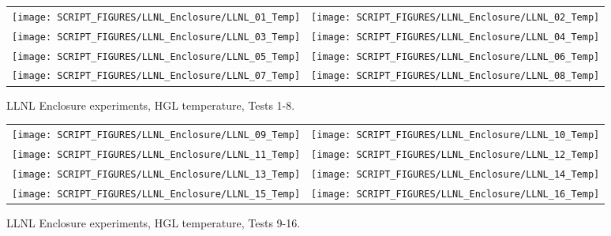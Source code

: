 \newpage

\begin{figure}[p]
\begin{tabular*}{\textwidth}{l@{\extracolsep{\fill}}r}
\texttt{[image: SCRIPT\_FIGURES/LLNL\_Enclosure/LLNL\_01\_Temp]} &
\texttt{[image: SCRIPT\_FIGURES/LLNL\_Enclosure/LLNL\_02\_Temp]} \\
\texttt{[image: SCRIPT\_FIGURES/LLNL\_Enclosure/LLNL\_03\_Temp]} &
\texttt{[image: SCRIPT\_FIGURES/LLNL\_Enclosure/LLNL\_04\_Temp]} \\
\texttt{[image: SCRIPT\_FIGURES/LLNL\_Enclosure/LLNL\_05\_Temp]} &
\texttt{[image: SCRIPT\_FIGURES/LLNL\_Enclosure/LLNL\_06\_Temp]} \\
\texttt{[image: SCRIPT\_FIGURES/LLNL\_Enclosure/LLNL\_07\_Temp]} &
\texttt{[image: SCRIPT\_FIGURES/LLNL\_Enclosure/LLNL\_08\_Temp]}
\end{tabular*}
\caption[LLNL Enclosure experiments, HGL temperature, Tests 1-8]
{LLNL Enclosure experiments, HGL temperature, Tests 1-8.}
\label{LLNL_Enclosure_Temp_1}
\end{figure}

\begin{figure}[p]
\begin{tabular*}{\textwidth}{l@{\extracolsep{\fill}}r}
\texttt{[image: SCRIPT\_FIGURES/LLNL\_Enclosure/LLNL\_09\_Temp]} &
\texttt{[image: SCRIPT\_FIGURES/LLNL\_Enclosure/LLNL\_10\_Temp]} \\
\texttt{[image: SCRIPT\_FIGURES/LLNL\_Enclosure/LLNL\_11\_Temp]} &
\texttt{[image: SCRIPT\_FIGURES/LLNL\_Enclosure/LLNL\_12\_Temp]} \\
\texttt{[image: SCRIPT\_FIGURES/LLNL\_Enclosure/LLNL\_13\_Temp]} &
\texttt{[image: SCRIPT\_FIGURES/LLNL\_Enclosure/LLNL\_14\_Temp]} \\
\texttt{[image: SCRIPT\_FIGURES/LLNL\_Enclosure/LLNL\_15\_Temp]} &
\texttt{[image: SCRIPT\_FIGURES/LLNL\_Enclosure/LLNL\_16\_Temp]}
\end{tabular*}
\caption[LLNL Enclosure experiments, HGL temperature, Tests 9-16]
{LLNL Enclosure experiments, HGL temperature, Tests 9-16.}
\label{LLNL_Enclosure_Temp_2}
\end{figure}


